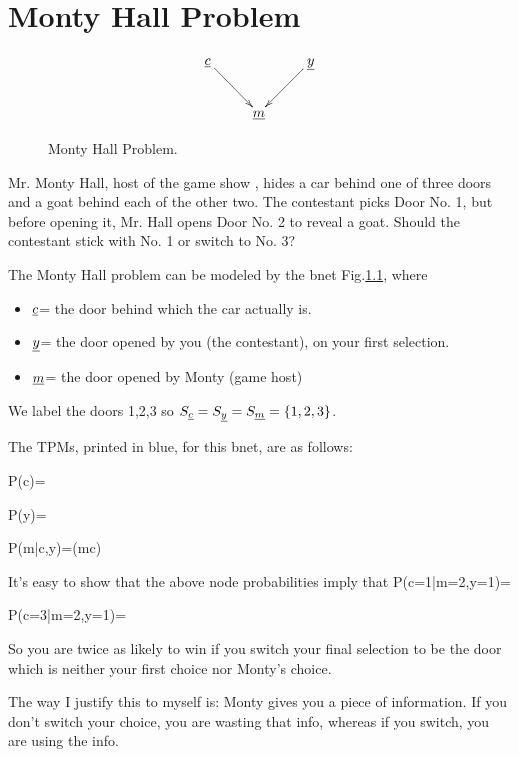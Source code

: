 \chapter{Monty Hall Problem}
\begin{figure}[h!]
\centering
$$\xymatrix{
\rvc\ar[dr]&&\rvy\ar[dl]\\
&\rvm&
}$$
\caption{Monty Hall Problem.}
\label{fig-monty}
\end{figure}

Mr. Monty Hall, host of the 
game show ,
 hides a car behind one of 
three doors and a goat 
behind each of the other two.
 The contestant picks Door No. 1,
 but before opening it, Mr. Hall 
opens Door No. 2 to reveal a goat. 
Should the contestant stick with No. 1 
or 
switch to No. 3?

The Monty Hall problem can be 
modeled by the bnet 
Fig.\ref{fig-monty}, where
\begin{itemize}
\item
$\rvc$= the door behind which the car actually is.
\item
$\rvy$= the door opened by you
 (the contestant), on your 
first selection.
\item
$\rvm$= the door opened by Monty (game host)
\end{itemize}

We label the doors 1,2,3 so
 $S_\rvc=S_\rvy=S_\rvm=\{1,2,3\}$.

The TPMs, printed in blue,
for this bnet, are as follows:

\beq\color{blue}
P(c)=
\eeq

\beq\color{blue}
P(y)=
\eeq

\beq\color{blue}
P(m|c,y)=\indi(m\neq c)\left[
\frac{1}{2}\indi(y=c)
+
\indi(y\neq c)\indi(m\neq y)\right]
\eeq

It's easy to show that the above
 node probabilities imply that
\beq
P(c=1|m=2,y=1)=
\eeq

\beq
P(c=3|m=2,y=1)=
\eeq

So you are twice as likely to
 win if you switch your final
 selection to be the door 
which is neither 
your first choice nor Monty's choice.

The way I justify this to myself
is: Monty gives you a
 piece of information.
If you don't switch your choice,
you are wasting that info, whereas
if you switch, you are using the info.


